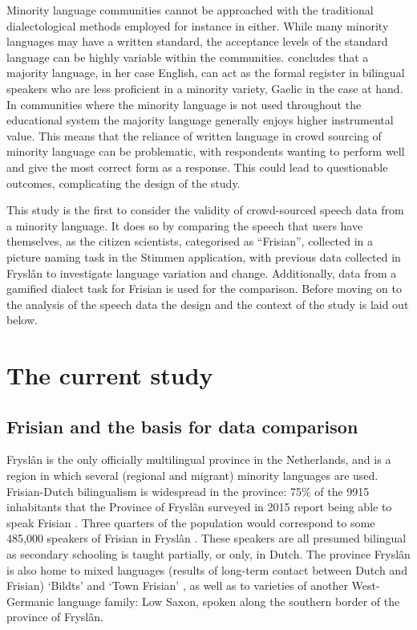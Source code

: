 \documentclass[output=paper,hidelinks]{langscibook}
\begin{document}
Minority language communities cannot be approached with the traditional dialectological methods employed for instance in \citet{LeemannEtAl2016} either. While many minority languages may have a written standard, the acceptance levels of the standard language can be highly variable within the communities. \citet[592]{dorian_fate_1978} concludes that a majority language, in her case English, can act as the formal register in bilingual speakers who are less proficient in a minority variety, Gaelic in the case at hand. In communities where the minority language is not used throughout the educational system the majority language generally enjoys higher instrumental value. This means that the reliance of written language in crowd sourcing of minority language can be problematic, with respondents wanting to perform well and give the most correct form as a response. This could lead to questionable outcomes, complicating the design of the study.

This study is the first to consider the validity of crowd-sourced speech data from a minority language. It does so by comparing the speech that users have themselves, as the citizen scientists, categorised as “Frisian”, collected in a picture naming task in the Stimmen application, with previous data collected in Fryslân to investigate language variation and change. Additionally, data from a gamified dialect task for Frisian is used for the comparison. Before moving on to the analysis of the speech data the design and the context of the study is laid out below.

\section{The current study}
\subsection{Frisian and the basis for data comparison}

Fryslân is the only officially multilingual province in the Netherlands, and is a region in which several (regional and migrant) minority languages are used. Frisian-Dutch bilingualism is widespread in the province: 75\% of the 9915 inhabitants that the Province of Fryslân surveyed in 2015 report being able to speak Frisian \citep[3]{ProvinsjeFrys2015}. Three quarters of the population would correspond to some 485,000 speakers of Frisian in Fryslân \citep{CentraalBureauvoordeStatistiek2018}. These speakers are all presumed bilingual as secondary schooling is taught partially, or only, in Dutch. The province Fryslân is also home to mixed languages (results of long-term contact between Dutch and Frisian) ‘Bildts’ and ‘Town Frisian’ \citep{bree1994het, hoekstra2000het}, as well as to varieties of another West-Germanic language family: Low Saxon, spoken along the southern border of the province of Fryslân. 
\end{document}

